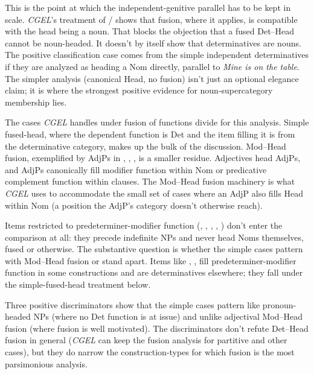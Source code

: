 \documentclass[12pt]{article}
\begin{document}
This is the point at which the independent-genitive parallel has to be kept in scale. \textit{CGEL}'s treatment of / shows that fusion, where it applies, is compatible with the head being a noun. That blocks the objection that a fused Det--Head cannot be noun-headed. It doesn't by itself show that determinatives are nouns. The positive classification case comes from the simple independent determinatives if they are analyzed as heading a Nom directly, parallel to \textit{Mine is on the table}. The simpler analysis (canonical Head, no fusion) isn't just an optional elegance claim; it is where the strongest positive evidence for noun-supercategory membership lies.

The cases \textit{CGEL} handles under fusion of functions divide for this analysis. Simple fused-head, where the dependent function is Det and the item filling it is from the determinative category, makes up the bulk of the discussion. Mod--Head fusion, exemplified by AdjPs in , , , is a smaller residue. Adjectives head AdjPs, and AdjPs canonically fill modifier function within Nom or predicative complement function within clauses. The Mod--Head fusion machinery is what \textit{CGEL} uses to accommodate the small set of cases where an AdjP also fills Head within Nom (a position the AdjP's category doesn't otherwise reach).

Items restricted to predeterminer-modifier function (, , , , ) don't enter the comparison at all: they precede indefinite NPs and never head Noms themselves, fused or otherwise. The substantive question is whether the simple cases pattern with Mod--Head fusion or stand apart. Items like , ,  fill predeterminer-modifier function in some constructions and are determinatives elsewhere; they fall under the simple-fused-head treatment below.

Three positive discriminators show that the simple cases pattern like pronoun-headed NPs (where no Det function is at issue) and unlike adjectival Mod--Head fusion (where fusion is well motivated). The discriminators don't refute Det--Head fusion in general (\textit{CGEL} can keep the fusion analysis for partitive and other cases), but they do narrow the construction-types for which fusion is the most parsimonious analysis.
\end{document}
